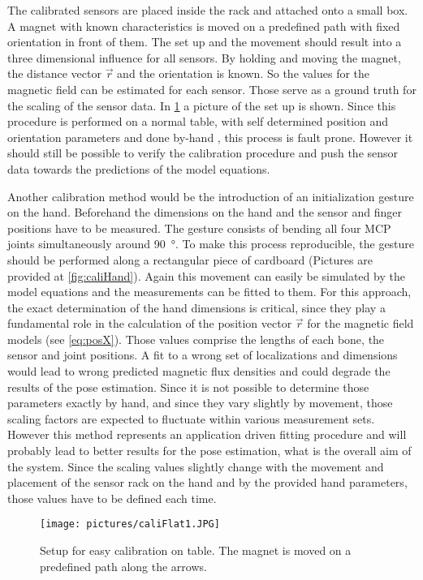 The calibrated sensors are placed inside the rack and attached onto a small box. A magnet with known characteristics is moved on a predefined path with fixed orientation in front of them. The set up and the movement should result into a three dimensional influence for all sensors. By holding and moving the magnet, the distance vector $ \vec{r} $ and the orientation is known. So the values for the magnetic field can be estimated for each sensor. Those serve as a ground truth for the scaling of the sensor data. In \ref{fig:caliFlat} a picture of the set up is shown. Since this procedure is performed on a normal table, with self determined position and orientation parameters and done \grqq by-hand \grqq, this process is fault prone. However it should still be possible to verify the calibration procedure and push the sensor data towards the predictions of the model equations.

Another calibration method would be the introduction of an initialization gesture on the hand. Beforehand the dimensions on the hand and the sensor and finger positions have to be measured. The gesture consists of bending all four \ac{MCP} joints simultaneously around \SI{90}{\degree}. To make this process reproducible, the gesture should be performed along a rectangular piece of cardboard (Pictures are provided at  \ref{fig:caliHand}). Again this movement can easily be simulated by the model equations and the measurements can be fitted to them. For this approach, the exact determination of the hand dimensions is critical, since they play a fundamental role in the calculation of the position vector $ \vec{r} $ for the magnetic field models (see \ref{eq:posX}). Those values comprise the lengths of each bone, the sensor and joint positions. A fit to a wrong set of localizations and dimensions would lead to wrong predicted magnetic flux densities and could degrade the results of the pose estimation. Since it is not possible to determine those parameters exactly by hand, and since they vary slightly by movement, those scaling factors are expected to fluctuate within various measurement sets. However this method represents an application driven fitting procedure and will probably lead to better results for the pose estimation, what is the overall aim of the system. Since the scaling values slightly change with the movement and placement of the sensor rack on the hand and by the provided hand parameters, those values have to be defined each time.
\begin{figure}[h]
\centering
\texttt{[image: pictures/caliFlat1.JPG]}
\caption{Setup for easy calibration on table. The magnet is moved on a predefined path along the arrows. }
\label{fig:caliFlat}
\end{figure}

